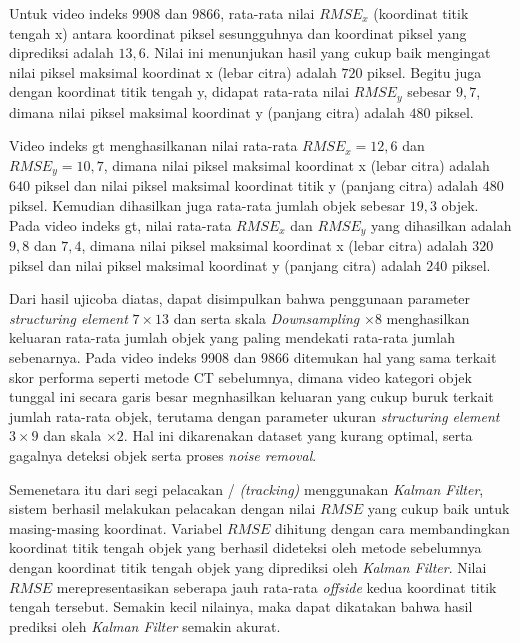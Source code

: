 	    Untuk video indeks 9908 dan 9866, rata-rata nilai $RMSE_x$ (koordinat titik tengah x) antara koordinat piksel sesungguhnya dan koordinat piksel yang diprediksi adalah $13,6$. Nilai ini menunjukan hasil yang cukup baik mengingat nilai piksel maksimal koordinat x (lebar citra) adalah $720$ piksel. Begitu juga dengan koordinat titik tengah y, didapat rata-rata nilai $RMSE_y$ sebesar $9,7$, dimana nilai piksel maksimal koordinat y (panjang citra) adalah $480$ piksel.
	    
	    Video indeks gt menghasilkanan nilai rata-rata $RMSE_x = 12,6$ dan $RMSE_y = 10,7$, dimana nilai piksel maksimal koordinat x (lebar citra) adalah $640$ piksel dan nilai piksel maksimal koordinat titik y (panjang citra) adalah $480$ piksel. Kemudian dihasilkan juga rata-rata jumlah objek sebesar $19,3$ objek. Pada video indeks gt, nilai rata-rata $RMSE_x$ dan $RMSE_y$ yang dihasilkan adalah $9,8$ dan $7,4$, dimana nilai piksel maksimal koordinat x (lebar citra) adalah $320$ piksel dan nilai piksel maksimal koordinat y (panjang citra) adalah $240$ piksel.
	    
	    Dari hasil ujicoba diatas, dapat disimpulkan bahwa penggunaan parameter \textit{structuring element} $7\times13$ dan serta skala \textit{Downsampling} $\times8$ menghasilkan keluaran rata-rata jumlah objek yang paling mendekati rata-rata jumlah sebenarnya. Pada video indeks 9908 dan 9866 ditemukan hal yang sama terkait skor performa seperti metode CT sebelumnya, dimana video kategori objek tunggal ini secara garis besar megnhasilkan keluaran yang cukup buruk terkait jumlah rata-rata objek, terutama dengan parameter ukuran \textit{structuring element} $3\times9$ dan skala $\times2$. Hal ini dikarenakan dataset yang kurang optimal, serta gagalnya deteksi objek serta proses \textit{noise removal}.
	    
	    Semenetara itu dari segi pelacakan / \textit{(tracking)} menggunakan \textit{Kalman Filter}, sistem berhasil melakukan pelacakan dengan nilai $RMSE$ yang cukup baik untuk masing-masing koordinat. Variabel $RMSE$ dihitung dengan cara membandingkan koordinat titik tengah objek yang berhasil dideteksi oleh metode sebelumnya dengan koordinat titik tengah objek yang diprediksi oleh \textit{Kalman Filter}. Nilai $RMSE$ merepresentasikan seberapa jauh rata-rata \textit{offside} kedua koordinat titik tengah tersebut. Semakin kecil nilainya, maka dapat dikatakan bahwa hasil prediksi oleh \textit{Kalman Filter} semakin akurat.
		 
